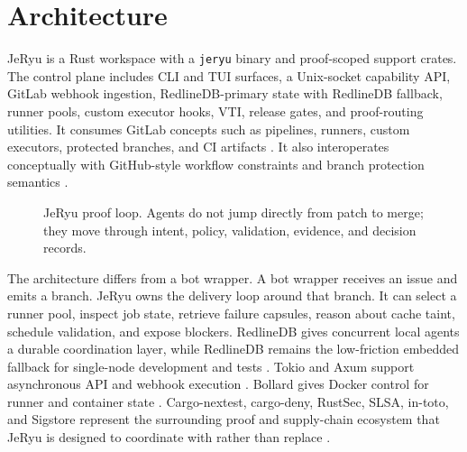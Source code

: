 \documentclass[conference]{IEEEtran}
\begin{document}
\section{Architecture}
JeRyu is a Rust workspace with a \texttt{jeryu} binary and proof-scoped support crates. The control plane includes CLI and TUI surfaces, a Unix-socket capability API, GitLab webhook ingestion, RedlineDB-primary state with RedlineDB fallback, runner pools, custom executor hooks, VTI, release gates, and proof-routing utilities. It consumes GitLab concepts such as pipelines, runners, custom executors, protected branches, and CI artifacts \cite{gitlab-ci-docs,gitlab-runners-docs,gitlab-custom-executor,gitlab-protected-branches}. It also interoperates conceptually with GitHub-style workflow constraints and branch protection semantics \cite{github-actions-docs,github-branch-protection}.

\begin{figure}[t]
\centering
{}
\caption{JeRyu proof loop. Agents do not jump directly from patch to merge; they move through intent, policy, validation, evidence, and decision records.}
\label{fig:proof-loop}
\end{figure}

The architecture differs from a bot wrapper. A bot wrapper receives an issue and emits a branch. JeRyu owns the delivery loop around that branch. It can select a runner pool, inspect job state, retrieve failure capsules, reason about cache taint, schedule validation, and expose blockers. RedlineDB gives concurrent local agents a durable coordination layer, while RedlineDB remains the low-friction embedded fallback for single-node development and tests \cite{redlineql,redline}. Tokio and Axum support asynchronous API and webhook execution \cite{tokio,axum}. Bollard gives Docker control for runner and container state \cite{bollard}. Cargo-nextest, cargo-deny, RustSec, SLSA, in-toto, and Sigstore represent the surrounding proof and supply-chain ecosystem that JeRyu is designed to coordinate with rather than replace \cite{rust-cargo-nextest,cargo-deny,rustsec,slsa,in-toto,sigstore}.
\end{document}
